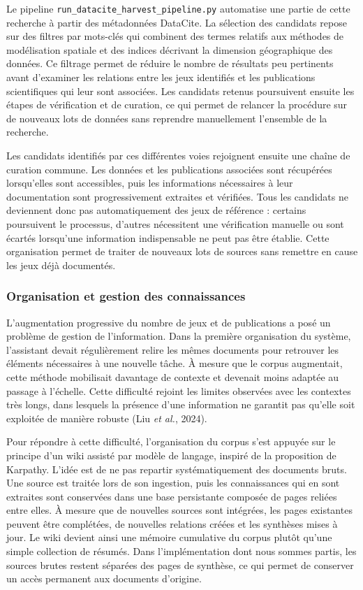 \documentclass[11pt,a4paper]{article}
\begin{document}
Le pipeline \texttt{run\_datacite\_harvest\_pipeline.py} automatise une partie de cette recherche à partir des métadonnées DataCite. La sélection des candidats repose sur des filtres par mots-clés qui combinent des termes relatifs aux méthodes de modélisation spatiale et des indices décrivant la dimension géographique des données. Ce filtrage permet de réduire le nombre de résultats peu pertinents avant d'examiner les relations entre les jeux identifiés et les publications scientifiques qui leur sont associées. Les candidats retenus poursuivent ensuite les étapes de vérification et de curation, ce qui permet de relancer la procédure sur de nouveaux lots de données sans reprendre manuellement l'ensemble de la recherche.

Les candidats identifiés par ces différentes voies rejoignent ensuite une chaîne de curation commune. Les données et les publications associées sont récupérées lorsqu'elles sont accessibles, puis les informations nécessaires à leur documentation sont progressivement extraites et vérifiées. Tous les candidats ne deviennent donc pas automatiquement des jeux de référence : certains poursuivent le processus, d'autres nécessitent une vérification manuelle ou sont écartés lorsqu'une information indispensable ne peut pas être établie. Cette organisation permet de traiter de nouveaux lots de sources sans remettre en cause les jeux déjà documentés.


\subsubsection{Organisation et gestion des connaissances}

L'augmentation progressive du nombre de jeux et de publications a posé un problème de gestion de l'information. Dans la première organisation du système, l'assistant devait régulièrement relire les mêmes documents pour retrouver les éléments nécessaires à une nouvelle tâche. À mesure que le corpus augmentait, cette méthode mobilisait davantage de contexte et devenait moins adaptée au passage à l'échelle. Cette difficulté rejoint les limites observées avec les contextes très longs, dans lesquels la présence d'une information ne garantit pas qu'elle soit exploitée de manière robuste (Liu \textit{et al.}, 2024).

Pour répondre à cette difficulté, l'organisation du corpus s'est appuyée sur le principe d'un wiki assisté par modèle de langage, inspiré de la proposition de Karpathy. L'idée est de ne pas repartir systématiquement des documents bruts. Une source est traitée lors de son ingestion, puis les connaissances qui en sont extraites sont conservées dans une base persistante composée de pages reliées entre elles. À mesure que de nouvelles sources sont intégrées, les pages existantes peuvent être complétées, de nouvelles relations créées et les synthèses mises à jour. Le wiki devient ainsi une mémoire cumulative du corpus plutôt qu'une simple collection de résumés. Dans l'implémentation dont nous sommes partis, les sources brutes restent séparées des pages de synthèse, ce qui permet de conserver un accès permanent aux documents d'origine.
\end{document}
